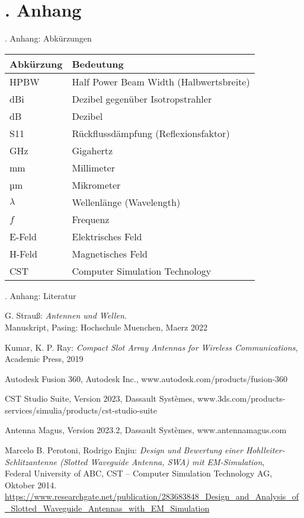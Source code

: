 \documentclass[
  aspectratio=169, %
]{beamer}
\begin{document}
\section*{\thesection. Anhang}
\begin{frame}{\thesection. Anhang: Abkürzungen}
\scriptsize
\begin{tabular}{|l|l|}
\hline
\textbf{Abkürzung} & \textbf{Bedeutung} \\
\hline
HPBW        & Half Power Beam Width (Halbwertsbreite) \\
dBi         & Dezibel gegenüber Isotropstrahler \\
dB          & Dezibel \\
S11         & Rückflussdämpfung (Reflexionsfaktor) \\
GHz         & Gigahertz \\
mm          & Millimeter \\
µm          & Mikrometer \\
$\lambda$   & Wellenlänge (Wavelength) \\
$f$         & Frequenz \\
E-Feld      & Elektrisches Feld \\
H-Feld      & Magnetisches Feld \\
CST         & Computer Simulation Technology \\
\hline
\end{tabular}
\end{frame}

\begin{frame}[allowframebreaks]{\thesection. Anhang: Literatur}
\begin{thebibliography}{}

G. Strauß: \textit{Antennen und Wellen}.\\ Manuskript, Pasing: Hochschule Muenchen, Maerz 2022

Kumar, K. P. Ray: \textit{Compact Slot Array Antennas for Wireless Communications},\\ Academic Press, 2019

Autodesk Fusion 360, Autodesk Inc., www.autodesk.com/products/fusion-360

CST Studio Suite, Version 2023, Dassault Systèmes, www.3ds.com/products-services/simulia/products/cst-studio-suite

Antenna Magus, Version 2023.2, Dassault Systèmes, www.antennamagus.com

Marcelo B. Perotoni, Rodrigo Enjiu: \textit{Design und Bewertung einer Hohlleiter-Schlitzantenne (Slotted Waveguide Antenna, SWA) mit EM-Simulation},\\ Federal University of ABC, CST – Computer Simulation Technology AG, Oktober 2014.\\
\url{https://www.researchgate.net/publication/283683848_Design_and_Analysis_of_Slotted_Waveguide_Antennas_with_EM_Simulation}

\end{thebibliography}
\end{frame}
\end{document}
